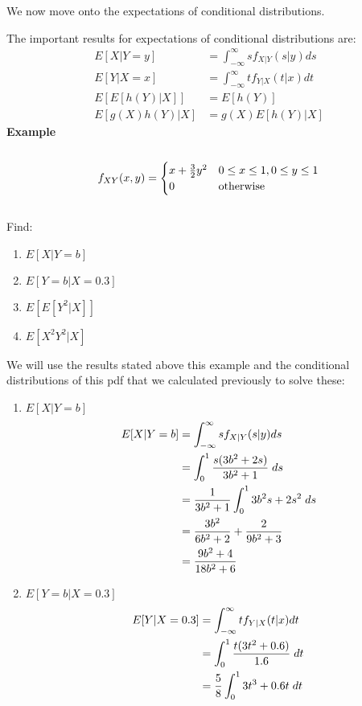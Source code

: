 \documentclass[,oneside]{article}
\begin{document}
\begin{enumerate}
\begin{enumerate}
We now move onto the expectations of conditional distributions.
\end{enumerate}
The important results for expectations of conditional distributions are:
\begin{align*}
E[X|Y=y]&=\int_{-\infty}^{\infty} s f_{X|Y}(s|y)ds\\
E[Y|X=x]&=\int_{-\infty}^{\infty} t f_{Y|X}(t|x)dt\\
E[E[h(Y)|X]]&=E[h(Y)]\\
E[g(X)h(Y)|X]&=g(X)E[h(Y)|X]
\end{align*}
\textbf{Example}\\ \\ 
\[
f_{XY}(x,y)=
\begin{cases}
x+\frac{3}{2}y^2 &  0 \leq x \leq 1, 0 \leq y \leq 1\\
0 & $otherwise$
\end{cases} \] \\
Find:
\begin{enumerate}
\item $E[X|Y=b]$
\item $E[Y=b|X=0.3]$
\item $E[E[Y^2|X]]$
\item $E[X^2 Y^2|X]$
\end{enumerate}
We will use the results stated above this example and the conditional distributions of this pdf that we calculated previously to solve these:\\
\begin{enumerate}
\item $E[X|Y=b]$
\begin{align*}
E[X|Y=b]&= \int_{-\infty}^{\infty}  s f_{X|Y}(s|y)ds\\
&= \int_{0}^{1} \frac{s(3b^2+2s)}{3b^2+1} \hspace{0.1cm}ds\\
&= \frac{1}{3b^2+1} \int_{0}^{1} 3b^2 s + 2s^2 \hspace{0.1cm}ds\\
&= \frac{3b^2}{6b^2+2}+\frac{2}{9b^2+3}\\
&=\frac{9b^2+4}{18b^2+6}
\end{align*}
\item $E[Y=b|X=0.3]$
\begin{align*}
E[Y|X=0.3]&= \int_{-\infty}^{\infty}  t f_{Y|X}(t|x)dt\\
&= \int_{0}^{1} \frac{t(3t^2+0.6)}{1.6} \hspace{0.1cm}dt\\
&= \frac{5}{8} \int_{0}^{1} 3t^3 + 0.6t \hspace{0.1cm}dt\\

\end{align*}
\end{enumerate}
\end{enumerate}
\end{document}
